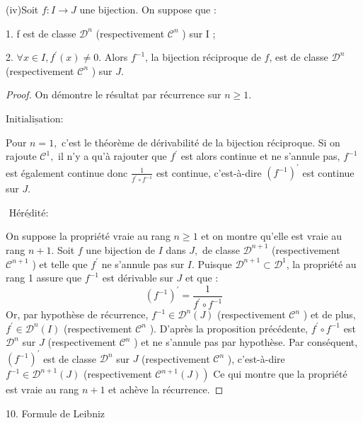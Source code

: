 \documentclass[12pt]{book}
\theoremstyle{definition}\newtheorem{dfn}{Définition}[chapter]
\theoremstyle{plain}\newtheorem{thm}{Théorème}[chapter]
\theoremstyle{plain}\newtheorem{prp}{Proposition}[chapter]
\theoremstyle{plain}\newtheorem{lem}{\bf Lemme}[chapter]
\theoremstyle{plain}\newtheorem{axm}{\bf Axiome}[chapter]
\theoremstyle{plain}\newtheorem{lmm}{\bf Lemme}[chapter]
\theoremstyle{plain}\newtheorem{cor}{\bf Corollaire}[chapter]
\theoremstyle{remark}\newtheorem{rem}{Remarque}[chapter]
\begin{document}
(iv)Soit $f: I \rightarrow J$ une bijection. On suppose que :

1. f est de classe $\mathcal{D}^{n}$ (respectivement $\mathcal{C}^{n}$ ) sur I ;

2. $\forall x \in I, f^{\prime}(x) \neq 0$.
Alors $f^{-1}$, la bijection réciproque de $f$, est de classe $\mathcal{D}^{n}$ (respectivement $\mathcal{C}^{n}$ ) sur $J$.
\begin{proof}

On démontre le résultat par récurrence sur $n \geqslant 1$. 

$\underline{\text {Initialisation: }}$

Pour $n=1,$ c'est le théorème de dérivabilité de la bijection réciproque. Si on rajoute $\mathcal{C}^{1},$ il n'y a qu'à rajouter que $f^{\prime}$ est alors continue et ne s'annule pas, $f^{-1}$ est également continue donc $\frac{1}{f^{\prime} \circ f^{-1}}$ est continue, c'est-à-dire $\left(f^{-1}\right)^{\prime}$ est continue sur $J$.

$\underline{\text { Hérédité: }}$


On suppose la propriété vraie au rang $n \geqslant 1$ et on montre qu'elle est vraie au rang $n+1$. Soit $f$ une bijection de $I$ dans $J,$ de classe $\mathcal{D}^{n+1}$ (respectivement $\mathcal{C}^{n+1}$ ) et telle que $f^{\prime}$ ne s'annule pas sur $I$. Puisque $\mathcal{D}^{n+1} \subset \mathcal{D}^{1}$, la propriété au rang 1 assure que $f^{-1}$ est dérivable sur $J$ et que :
$$
\left(f^{-1}\right)^{\prime}=\frac{1}{f^{\prime} \circ f^{-1}}
$$
Or, par hypothèse de récurrence, $f^{-1} \in \mathcal{D}^{n}(J)$ (respectivement $\mathcal{C}^{n}$ ) et de plus, $f^{\prime} \in \mathcal{D}^{n}(I)$ (respectivement $\mathcal{C}^{n}$ ). D'après la proposition précédente, $f^{\prime} \circ f^{-1}$ est $\mathcal{D}^{n}$ sur $J$ (respectivement $\mathcal{C}^{n}$ ) et ne s'annule pas par hypothèse. Par conséquent, $\left(f^{-1}\right)^{\prime}$ est de classe $\mathcal{D}^{n}$ sur $J$ (respectivement $\mathcal{C}^{n}$ ), c'est-à-dire $f^{-1} \in \mathcal{D}^{n+1}(J)$ (respectivement $\left.\mathcal{C}^{n+1}(J)\right)$ Ce qui montre que la propriété est vraie au rang $n+1$ et achève la récurrence.

\end{proof}

10. Formule de Leibniz
\end{document}
